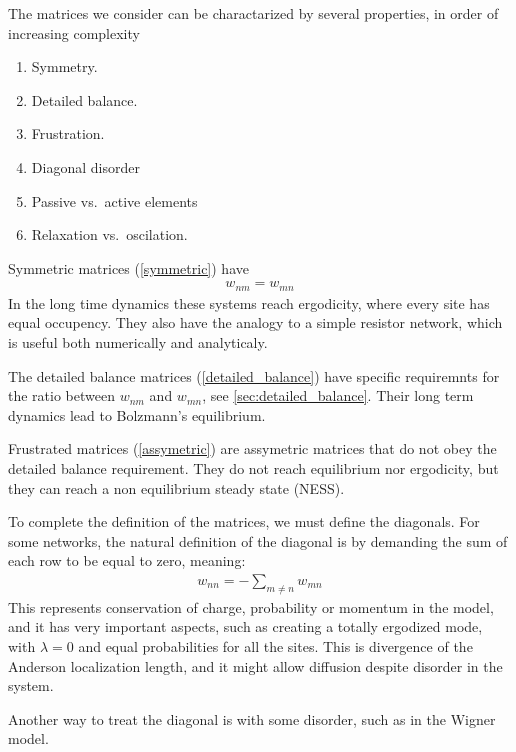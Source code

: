 The matrices we consider can be charactarized by several properties,  
in order of increasing complexity
\begin{enumerate}
    \item
        \label{symmetric} Symmetry.
    \item
        \label{detailed_balance} Detailed balance.
    \item
       \label{assymetric} Frustration.
    \item 
       \label{diagonal} Diagonal disorder
    \item
       \label{active} Passive vs.\ active elements
    \item
       \label{relaxation} Relaxation vs.\ oscilation.
\end{enumerate}
%
Symmetric matrices (\ref{symmetric}) have
%
\begin{align}
w_{nm}=w_{mn}
\end{align}
%
In the long time dynamics these systems reach ergodicity, where every 
site has equal occupency. They also have the analogy to a
simple resistor network, which is useful both numerically and analyticaly. 


The detailed balance matrices (\ref{detailed_balance}) have specific 
requiremnts for the ratio between $w_{nm}$ and $w_{mn}$, see \ref{sec:detailed_balance}.
Their long term dynamics lead to Bolzmann's equilibrium. 


Frustrated matrices (\ref{assymetric}) are assymetric matrices 
that do not obey the detailed balance requirement.  
They do not reach equilibrium nor ergodicity, but they can reach
a non equilibrium steady state (NESS). 





To complete the definition of the matrices, we must define the diagonals.
For some networks, the
natural definition of the diagonal is by demanding the sum of each row to 
be equal to zero, meaning:
%
\begin{align}
w_{nn} = -\sum_{m\ne n} w_{mn}
\end{align}
%
This represents conservation of charge, probability or momentum
in the model, and it has very important aspects, such as creating a totally ergodized mode,
with $\lambda=0$ and equal probabilities for all the sites. This is divergence 
of the Anderson localization length, and it might allow diffusion despite 
disorder in the system.


Another way to treat the diagonal is with some disorder, such as in the
Wigner model.

